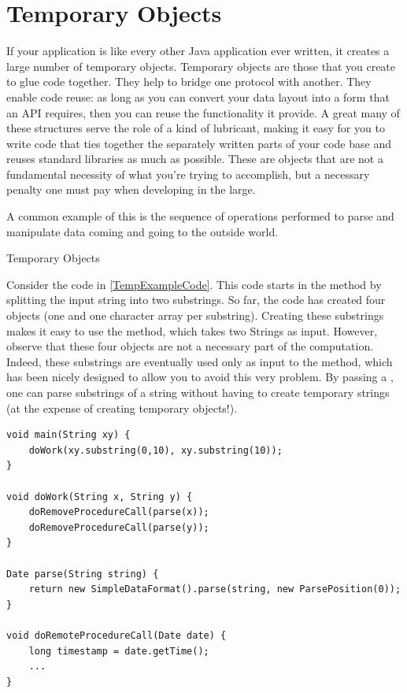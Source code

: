 \section{Temporary Objects}
\label{temporary-lifetime}

If your application is like every other Java application ever written, it creates
a large number of temporary objects. Temporary objects are those that you create
to glue code together. They help to bridge one protocol with another. They enable
code reuse: as long as you can convert your data layout into a form that an API
requires, then you can reuse the functionality it provide. A great many of these
structures serve the role of a kind of lubricant, making it easy for you to write
code that ties together the separately written parts of your code base and reuses
standard libraries as much as possible. These are objects that are not a
fundamental necessity of what you're trying to accomplish, but a necessary
penalty one must pay when developing in the large.

A common example of this is the sequence of operations performed to parse and
manipulate data coming and going to the outside world. 

\begin{example}{Temporary Objects}

Consider the code in \autoref{TempExampleCode}. This code starts in
the  method by splitting the input string into two substrings. So
far, the code has created four objects (one  and one character
array per substring). 
Creating these substrings makes it easy to use the  method, which
takes two Strings as input. However, observe
that these four objects are not a necessary part of the computation. Indeed,
these substrings are eventually used only as input to the
  method, which has been nicely designed to
allow you to avoid this very problem. By passing a , one
can parse substrings of a string without having to create temporary strings (at
the expense of creating temporary  objects!).



\begin{lstlisting}[float,caption=An example that constructs 8 temporary
objects to handle two dates.,label=TempExampleCode]
void main(String xy) {
	doWork(xy.substring(0,10), xy.substring(10));
}
	
void doWork(String x, String y) {
	doRemoveProcedureCall(parse(x));
	doRemoveProcedureCall(parse(y));
}
	
Date parse(String string) {
	return new SimpleDataFormat().parse(string, new ParsePosition(0));
}

void doRemoteProcedureCall(Date date) {
	long timestamp = date.getTime();
	...
}
\end{lstlisting}

\end{example}

